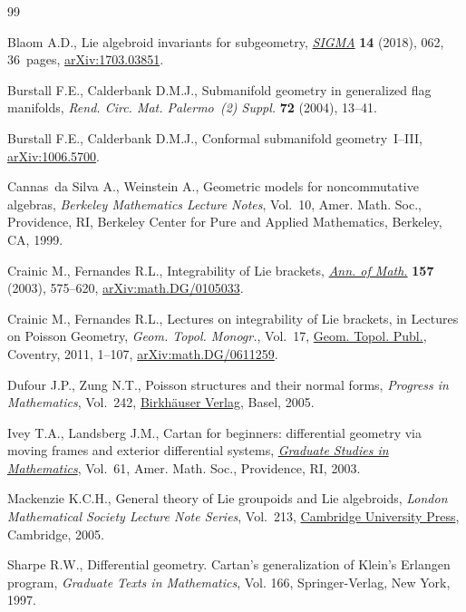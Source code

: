 \begin{thebibliography}{99}
\footnotesize\itemsep=0pt

Blaom A.D., Lie algebroid invariants for subgeometry, \href{https://doi.org/10.3842/SIGMA.2018.062}{\textit{SIGMA}}
 \textbf{14} (2018), 062, 36~pages, \href{https://arxiv.org/abs/1703.03851}{arXiv:1703.03851}.

Burstall F.E., Calderbank D.M.J., Submanifold geometry in generalized flag
 manifolds, \textit{Rend. Circ. Mat. Palermo~(2) Suppl.} \textbf{72} (2004),
 13--41.

Burstall F.E., Calderbank D.M.J., Conformal submanifold geometry~{I}--{III},
 \href{https://arxiv.org/abs/1006.5700}{arXiv:1006.5700}.

Cannas~da Silva A., Weinstein A., Geometric models for noncommutative algebras,
 \textit{Berkeley Mathematics Lecture Notes}, Vol.~10, Amer. Math. Soc.,
 Providence, RI, Berkeley Center for Pure and Applied Mathematics, Berkeley,
 CA, 1999.

Crainic M., Fernandes R.L., Integrability of {L}ie brackets, \href{https://doi.org/10.4007/annals.2003.157.575}{\textit{Ann. of
 Math.}} \textbf{157} (2003), 575--620, \href{https://arxiv.org/abs/math.DG/0105033}{arXiv:math.DG/0105033}.

Crainic M., Fernandes R.L., Lectures on integrability of {L}ie brackets, in
 Lectures on {P}oisson Geometry, \textit{Geom. Topol. Monogr.}, Vol.~17, \href{https://doi.org/10.2140/gt}{Geom.
 Topol. Publ.}, Coventry, 2011, 1--107, \href{https://arxiv.org/abs/math.DG/0611259}{arXiv:math.DG/0611259}.

Dufour J.P., Zung N.T., Poisson structures and their normal forms,
 \textit{Progress in Mathematics}, Vol.~242, \href{https://doi.org/10.1007/b137493}{Birkh\"auser Verlag}, Basel, 2005.

Ivey T.A., Landsberg J.M., Cartan for beginners: differential geometry via
 moving frames and exterior differential systems, \href{https://doi.org/10.1090/gsm/061}{\textit{Graduate Studies in
 Mathematics}}, Vol.~61, Amer. Math. Soc., Providence, RI, 2003.

Mackenzie K.C.H., General theory of {L}ie groupoids and {L}ie algebroids,
 \textit{London Mathematical Society Lecture Note Series}, Vol.~213, \href{https://doi.org/10.1017/CBO9781107325883}{Cambridge
 University Press}, Cambridge, 2005.

Sharpe R.W., Differential geometry. {C}artan's generalization of {K}lein's
 {E}rlangen program, \textit{Graduate Texts in Mathematics}, Vol. 166,
 Springer-Verlag, New York, 1997.

\end{thebibliography}
